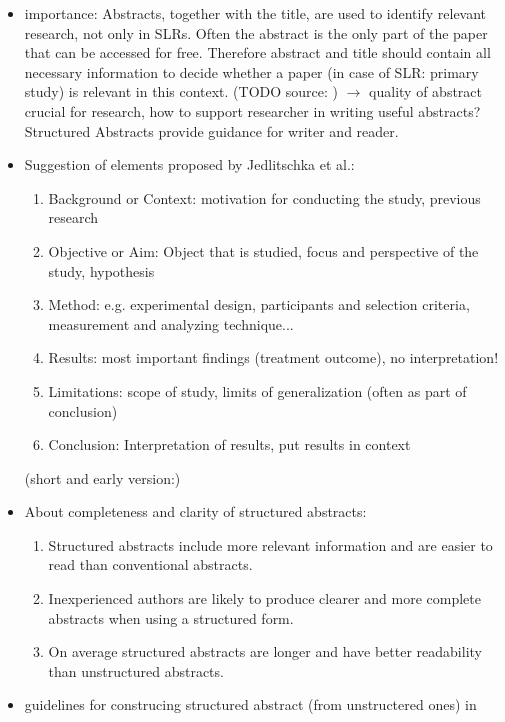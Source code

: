\begin{itemize}
\item importance: Abstracts, together with the title, are used to identify relevant research, not only in SLRs. Often the abstract is the only part of the paper that can be accessed for free. Therefore abstract and title should contain all necessary information to decide whether a paper (in case of SLR: primary study) is relevant in this context. (TODO source: )
	$\rightarrow$ quality of abstract crucial for research, how to support researcher in writing useful abstracts? Structured Abstracts provide guidance for writer and reader. 
\item Suggestion of elements proposed by Jedlitschka et al.\cite{Jedlitschka2008}: 
	\begin{enumerate}
		\item Background or Context: motivation for conducting the study, previous research
		\item Objective or Aim: Object that is studied, focus and perspective of the study, hypothesis
		\item Method: e.g. experimental design, participants and selection criteria, measurement and analyzing technique...
		\item Results: most important findings (treatment outcome), no interpretation!
		\item Limitations: scope of study, limits of generalization (often as part of conclusion)
		\item Conclusion: Interpretation of results, put results in context
	\end{enumerate}
	(short and early version:\cite{Jedlitschka2005})
\item About completeness and clarity of structured abstracts:
	\begin{enumerate}
	\item Structured abstracts include more relevant information and are easier to read than conventional abstracts. \cite{Budgen2008} \cite{Budgen2007}
	\item Inexperienced authors are likely to produce clearer and more complete abstracts when using a structured form.\cite{Budgen2011} 
	\item On average structured abstracts are longer and have better readability than unstructured abstracts. \cite{KBO2008}
	\end{enumerate}
\item guidelines for construcing structured abstract (from unstructered ones) in \cite{KBO2008}
\end{itemize}